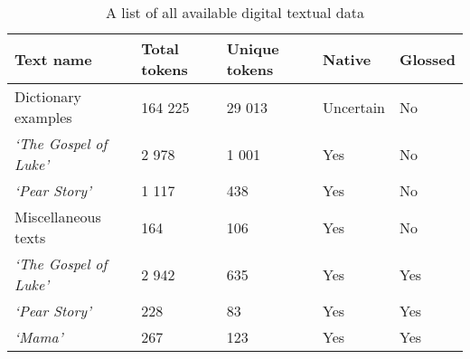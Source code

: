 \begin{table}[!h]
    \begin{center}
        \begin{tabular}{|l|l|l|l|l|}
            \hline
            \textbf{Text name} & \textbf{Total tokens} & \textbf{Unique tokens} & \textbf{Native} & \textbf{Glossed} \\
            \hline
            Dictionary examples & 164 225 & 29 013 & Uncertain & No \\
            \hline
            \textit{`The Gospel of Luke'} & 2 978 & 1 001 & Yes & No \\
            \textit{`Pear Story'} & 1 117 & 438 & Yes & No \\
            Miscellaneous texts & 164 & 106 & Yes & No \\
            \hline
            \textit{`The Gospel of Luke'} & 2 942 & 635 & Yes & Yes \\
            \textit{`Pear Story'} & 228 & 83 & Yes & Yes \\
            \textit{`Mama'} & 267 & 123 & Yes & Yes \\
            \hline
        \end{tabular}
        \caption{A list of all available digital textual data }
        \label{Tab:all_texts}
    \end{center}
\end{table}
